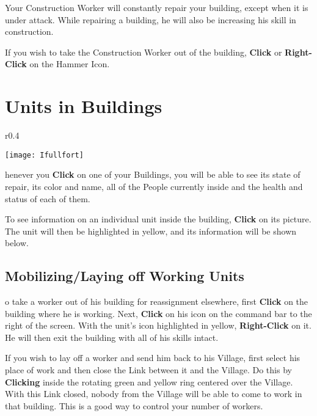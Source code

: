 Your Construction Worker will constantly repair your building, except when it is under attack. While repairing a building, he will also be increasing his skill in construction.

If you wish to take the Construction Worker out of the building, \textbf{Click} or \textbf{Right-Click} on the Hammer Icon.

\section{\textsf{Units in Buildings}}


\begin{wrapfigure}{r}{0.4\textwidth}
    \vspace{-20pt}
    \begin{center}
        \texttt{[image: Ifullfort]} %
    \end{center}
    \vspace{-10pt}
\end{wrapfigure}

henever you \textbf{Click} on one of your Buildings, you will be able to see its state of repair, its color and name, all of the People currently inside and the health and status of each of them.

To see information on an individual unit inside the building, \textbf{Click} on its picture. The unit will then be highlighted in yellow, and its information will be shown below.

\subsection{\textsf{Mobilizing/Laying off Working Units}}


o take a worker out of his building for reassignment elsewhere, first \textbf{Click} on the building where he is working. Next, \textbf{Click} on his icon on the command bar to the right of the screen. With the unit’s icon highlighted in yellow, \textbf{Right-Click} on it. He will then exit the building with all of his skills intact.

If you wish to lay off a worker and send him back to his Village, first select his place of work and then close the Link between it and the Village. Do this by \textbf{Clicking} inside the rotating green and yellow ring centered over the Village. With this Link closed, nobody from the Village will be able to come to work in that building. This is a good way to control your number of workers.

